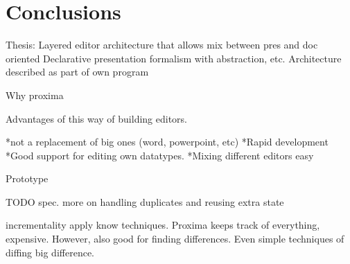 \chapter{Conclusions}
\label{chap:conclusions}


Thesis:
Layered editor architecture that allows mix between pres and doc oriented
Declarative presentation formalism with abstraction, etc.
Architecture described as part of own program

Why proxima

Advantages of this way of building editors.

*not a replacement of big ones (word, powerpoint, etc)
*Rapid development
*Good support for editing own datatypes.
*Mixing different editors easy

Prototype

TODO
spec. more on handling duplicates and reusing extra state

incrementality
apply know techniques.
Proxima keeps track of everything, expensive. However, also good for finding differences. Even simple techniques of diffing big difference.